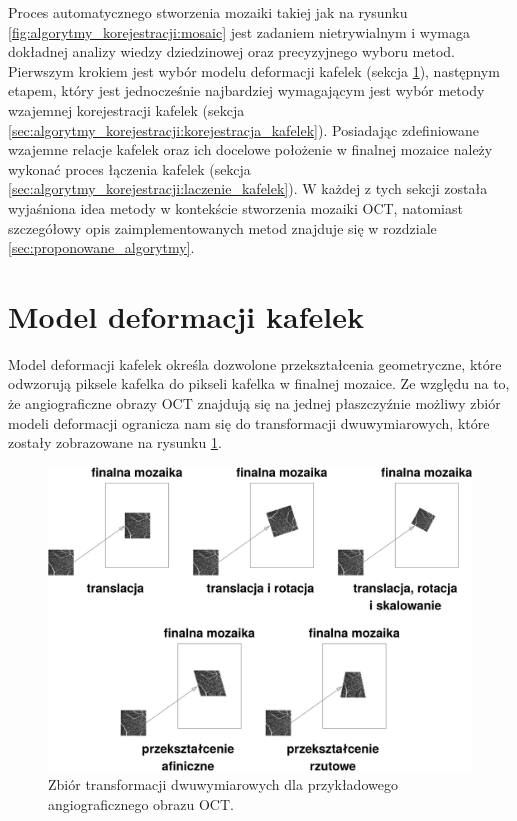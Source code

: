 Proces automatycznego stworzenia mozaiki takiej jak na rysunku \ref{fig:algorytmy_korejestracji:mosaic} jest zadaniem nietrywialnym i wymaga dokładnej analizy wiedzy dziedzinowej oraz precyzyjnego wyboru metod. Pierwszym krokiem jest wybór modelu deformacji kafelek (sekcja \ref{sec:algorytmy_korejestracji:model_deformacji}), następnym etapem, który jest jednocześnie najbardziej wymagającym jest wybór metody wzajemnej korejestracji kafelek (sekcja \ref{sec:algorytmy_korejestracji:korejestracja_kafelek}). Posiadając zdefiniowane wzajemne relacje kafelek oraz ich docelowe położenie w finalnej mozaice należy wykonać proces łączenia kafelek (sekcja \ref{sec:algorytmy_korejestracji:laczenie_kafelek}). W każdej z tych sekcji została wyjaśniona idea metody w kontekście stworzenia mozaiki OCT, natomiast szczegółowy opis zaimplementowanych metod znajduje się w rozdziale \ref{sec:proponowane_algorytmy}.

\section{Model deformacji kafelek}
\label{sec:algorytmy_korejestracji:model_deformacji}

Model deformacji kafelek określa dozwolone przekształcenia geometryczne, które odwzorują piksele kafelka do pikseli kafelka w finalnej mozaice. Ze względu na to, że angiograficzne obrazy OCT znajdują się na jednej płaszczyźnie możliwy zbiór modeli deformacji ogranicza nam się do transformacji dwuwymiarowych, które zostały zobrazowane na rysunku \ref{fig:algorytmy_korejestracji:trans}.

\begin{figure}[H]
  \centering
  \includegraphics[width=\textwidth]{gfx/trans}
  \caption{Zbiór transformacji dwuwymiarowych dla przykładowego angiograficznego obrazu OCT.}
  \label{fig:algorytmy_korejestracji:trans}
\end{figure}


